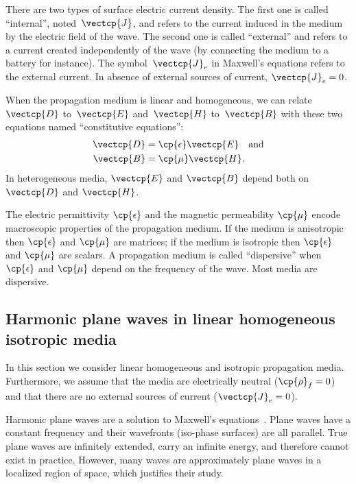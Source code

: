 There are two types of surface electric current density.
The first one is called ``internal'', noted~$\vectcp{J}$, and refers to the current induced in the medium by the electric field of the wave.
The second one is called ``external'' and refers to a current created independently of the wave (by connecting the medium to a battery for instance).
The symbol~$\vectcp{J}_e$ in Maxwell's equations refers to the external current.
In absence of external sources of current, $\vectcp{J}_e=0$.

When the propagation medium is linear and homogeneous,
we can relate $\vectcp{D}$ to~$\vectcp{E}$
and~$\vectcp{H}$ to~$\vectcp{B}$
with these two equations named ``constitutive equations'':
\begin{subequations}
    \label{eq:complex_constitutive}
    \begin{align}
        \vectcp{D} &= \cp{\epsilon} \vectcp{E} \text{\quad and}
        \label{eq:complex_constitutive_electric}
        \\
        \vectcp{B} &= \cp{\mu}      \vectcp{H}
        \label{eq:complex_constitutive_magnetic}
        \text{.}
    \end{align}
\end{subequations}
In heterogeneous media, $\vectcp{E}$ and $\vectcp{B}$ depend both on $\vectcp{D}$ and $\vectcp{H}$.

The electric permittivity $\cp{\epsilon}$ and
the magnetic permeability $\cp{\mu}$
encode macroscopic properties of the propagation medium.
If the medium is anisotropic then $\cp{\epsilon}$ and $\cp{\mu}$ are matrices;
if the medium is isotropic   then $\cp{\epsilon}$ and $\cp{\mu}$ are scalars.
A propagation medium is called ``dispersive'' when $\cp{\epsilon}$ and $\cp{\mu}$ depend on the frequency of the wave.
Most media are dispersive.




\subsection{Harmonic plane waves in linear homogeneous isotropic media}

In this section we consider linear homogeneous and isotropic propagation media.
Furthermore, we assume that the media are electrically neutral ($\cp{\rho}_f = 0$) and that there are no external sources of current ($\vectcp{J}_e=0$).

Harmonic plane waves are a solution to Maxwell's equations~\cite{stratton1941electromagnetic}.
Plane waves have a constant frequency and their wavefronts (iso-phase surfaces) are all parallel.
True plane waves are infinitely extended, carry an infinite energy, and therefore cannot exist in practice.
However, many waves are approximately plane waves in a localized region of space,
which justifies their study.

